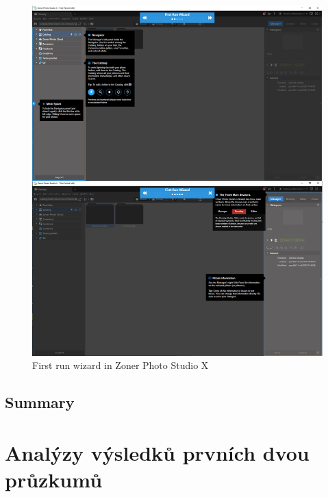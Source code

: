\documentclass[a4paper,10pt,twoside]{article}
\begin{document}
\vspace{0.3cm}
\begin{figure}[hbt!] 
\begin{center}
\includegraphics[width=15cm]{../pictures/zoner.png} 
\caption[First run wizard in Zoner Photo Studio X]{First run wizard in Zoner Photo Studio X}
\label{fig:zoner}
\end{center}
\end{figure}

\newpage
\vspace*{-1cm}
\subsection{Summary}




\newpage
\vspace*{-1cm}
\section{Analýzy výsledků prvních dvou průzkumů}
\end{document}
